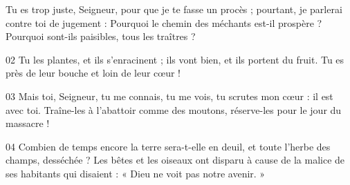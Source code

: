 Tu es trop juste, Seigneur, pour que je te fasse un procès ; pourtant, je parlerai contre toi de jugement : Pourquoi le chemin des méchants est-il prospère ? Pourquoi sont-ils paisibles, tous les traîtres ?

02 Tu les plantes, et ils s’enracinent ; ils vont bien, et ils portent du fruit. Tu es près de leur bouche et loin de leur cœur !

03 Mais toi, Seigneur, tu me connais, tu me vois, tu scrutes mon cœur : il est avec toi. Traîne-les à l’abattoir comme des moutons, réserve-les pour le jour du massacre !

04 Combien de temps encore la terre sera-t-elle en deuil, et toute l’herbe des champs, desséchée ? Les bêtes et les oiseaux ont disparu à cause de la malice de ses habitants qui disaient : « Dieu ne voit pas notre avenir. »